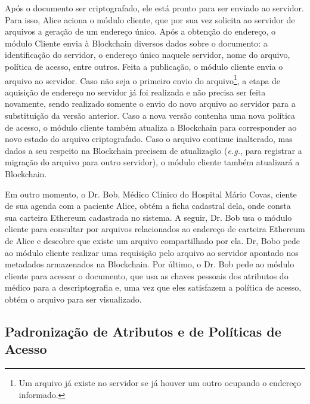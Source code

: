\documentclass[a4paper,11pt]{article}
\begin{document}
Após o documento ser criptografado, ele está pronto para ser enviado ao servidor.
Para isso, Alice aciona o módulo cliente, que por sua vez solicita ao servidor de arquivos a geração de um endereço único.
Após a obtenção do endereço, o módulo Cliente envia à Blockchain diversos dados sobre o documento: a identificação do servidor, o endereço único naquele servidor, nome do arquivo, política de acesso,  entre outros. %
Feita a publicação, o módulo cliente envia o arquivo ao servidor.
Caso não seja o primeiro envio do arquivo\footnote{Um arquivo já existe no servidor se já houver um outro ocupando o endereço informado.}, a etapa de aquisição de endereço no servidor já foi realizada e não precisa ser feita novamente, sendo realizado somente o envio do novo arquivo ao servidor para a substituição da versão anterior.
Caso a nova versão contenha uma nova política de acesso, o módulo cliente também atualiza a Blockchain para corresponder ao novo estado do arquivo criptografado.
Caso o arquivo continue inalterado, mas dados a seu respeito na Blockchain precisem de atualização (\emph{e.g.}, para registrar a migração do arquivo para outro servidor), o módulo cliente também atualizará a Blockchain.

Em outro momento, o Dr. Bob, Médico Clínico do Hospital Mário Covas, ciente de sua agenda com a paciente Alice, obtém a ficha cadastral dela, onde consta sua carteira Ethereum  cadastrada no sistema. A seguir,
Dr. Bob usa o módulo cliente para consultar por arquivos relacionados ao endereço de carteira Ethereum de Alice e descobre que existe um arquivo compartilhado por ela.
Dr, Bobo pede ao módulo cliente realizar uma requisição pelo arquivo  ao servidor apontado nos metadados armazenados na Blockchain.
Por último, o Dr. Bob pede ao módulo cliente para acessar o documento, que usa  as chaves pessoais dos atributos do médico para a descriptografia e, uma vez que eles satisfazem a política de acesso, obtém o arquivo para ser visualizado.

\subsection{Padronização de Atributos e de Políticas de Acesso}
\label{sec:sub:padronizacao-permissoes}
\end{document}
